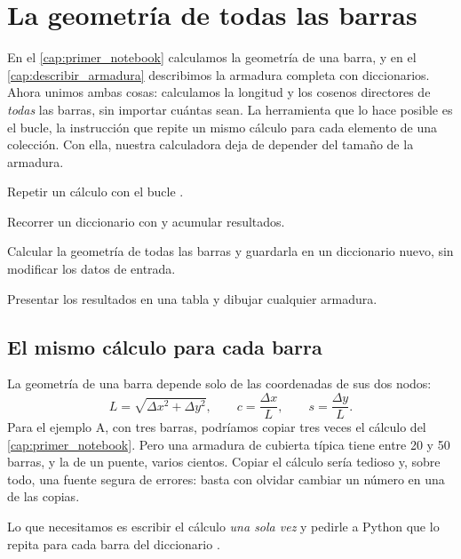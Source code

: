 \chapter{La geometría de todas las barras}\label{cap:geometria}

En el \cref{cap:primer_notebook} calculamos la geometría de una barra, y en el
\cref{cap:describir_armadura} describimos la armadura completa con
diccionarios. Ahora unimos ambas cosas: calculamos la longitud y los cosenos
directores de \emph{todas} las barras, sin importar cuántas sean. La
herramienta que lo hace posible es el bucle, la instrucción que repite un
mismo cálculo para cada elemento de una colección. Con ella, nuestra
calculadora deja de depender del tamaño de la armadura.

\begin{objetivos}
  \item Repetir un cálculo con el bucle .
  \item Recorrer un diccionario con  y acumular resultados.
  \item Calcular la geometría de todas las barras y guardarla en un
    diccionario nuevo, sin modificar los datos de entrada.
  \item Presentar los resultados en una tabla y dibujar cualquier armadura.
\end{objetivos}

\section{El mismo cálculo para cada barra}\label{sec:mismo_calculo}

La geometría de una barra depende solo de las coordenadas de sus dos nodos:
\[
  L = \sqrt{\Delta x^2 + \Delta y^2}, \qquad
  c = \frac{\Delta x}{L}, \qquad s = \frac{\Delta y}{L}.
\]
Para el ejemplo A, con tres barras, podríamos copiar tres veces el cálculo del
\cref{cap:primer_notebook}. Pero una armadura de cubierta típica tiene entre
20 y 50 barras, y la de un puente, varios cientos. Copiar el cálculo sería
tedioso y, sobre todo, una fuente segura de errores: basta con olvidar
cambiar un número en una de las copias.

Lo que necesitamos es escribir el cálculo \emph{una sola vez} y pedirle a
Python que lo repita para cada barra del diccionario .


